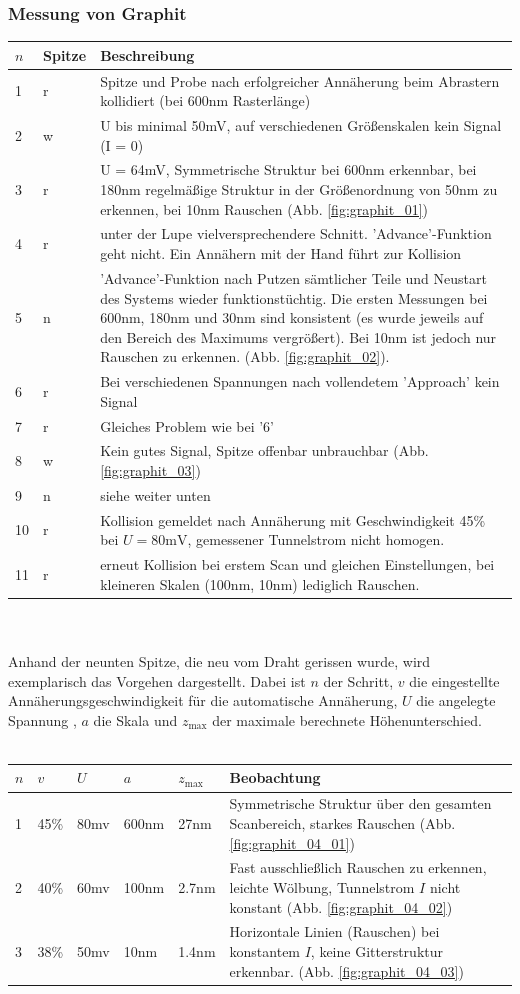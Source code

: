 \subsubsection{Messung von Graphit}
\newcommand{\EOL}{\\ \hline}
\begin{tabular}{|l | l | p{12cm}|}
\hline
$n$ & Spitze & Beschreibung \EOL
    1   & r & Spitze und Probe nach erfolgreicher Annäherung beim Abrastern 
kollidiert (bei 600nm Rasterlänge) \EOL
    2   & w & U bis minimal 50mV, auf verschiedenen Größenskalen kein Signal (I = 0) \EOL
    3   & r & U = 64mV, Symmetrische Struktur bei 600nm erkennbar, bei 180nm 
regelmäßige Struktur in der Größenordnung von 50nm zu erkennen, bei 10nm Rauschen 
(Abb. \ref{fig:graphit_01}) \EOL
    4   & r & unter der Lupe vielversprechendere Schnitt. 'Advance'-Funktion geht 
nicht. Ein Annähern mit der Hand führt zur Kollision \EOL
    5   & n & 'Advance'-Funktion nach Putzen sämtlicher Teile und Neustart des Systems wieder 
funktionstüchtig. Die ersten Messungen bei 600nm, 180nm und 30nm sind konsistent (es wurde 
jeweils auf den Bereich des Maximums vergrößert). Bei 10nm ist jedoch nur Rauschen zu erkennen.
(Abb. \ref{fig:graphit_02}). \EOL
    6   & r & Bei verschiedenen Spannungen nach vollendetem 'Approach' kein Signal \EOL
    7   & r & Gleiches Problem wie bei '6' \EOL
    8   & w & Kein gutes Signal, Spitze offenbar unbrauchbar
(Abb. \ref{fig:graphit_03}) \EOL
    9   & n & siehe weiter unten \EOL 
   10   & r & Kollision gemeldet nach Annäherung mit Geschwindigkeit 45\% bei
$U = 80\mathrm{mV}$, gemessener Tunnelstrom nicht homogen. \EOL
   11   & r & erneut Kollision bei erstem Scan und gleichen Einstellungen, bei kleineren 
Skalen (100nm, 10nm) lediglich Rauschen.  \EOL
\end{tabular}
\\\\
Anhand der neunten Spitze, die neu vom Draht gerissen wurde,  wird exemplarisch das Vorgehen 
dargestellt. Dabei ist $n$ der Schritt, $v$ die eingestellte Annäherungsgeschwindigkeit für 
die automatische Annäherung, $U$ die angelegte Spannung , $a$ die Skala 
und $z_{\mathrm{max}}$ der maximale berechnete Höhenunterschied.
\\\\
\begin{tabular}{|l |l |l |l |l |p{8cm}|}
\hline
$n$ & $v$ & $U$ & $a$ & $z_{\mathrm{max}}$ & Beobachtung \EOL
1   & 45\%  & 80mv  & 600nm & 27nm  & Symmetrische Struktur über den gesamten Scanbereich, 
starkes Rauschen 
(Abb. \ref{fig:graphit_04_01}) \EOL
2   & 40\%  & 60mv  & 100nm & 2.7nm  & Fast ausschließlich Rauschen zu erkennen, leichte 
Wölbung, Tunnelstrom $I$ nicht konstant 
(Abb. \ref{fig:graphit_04_02}) \EOL
3   & 38\%  & 50mv  & 10nm & 1.4nm  & Horizontale Linien (Rauschen) bei konstantem $I$, 
keine Gitterstruktur erkennbar.
(Abb. \ref{fig:graphit_04_03}) \EOL
\end{tabular}
